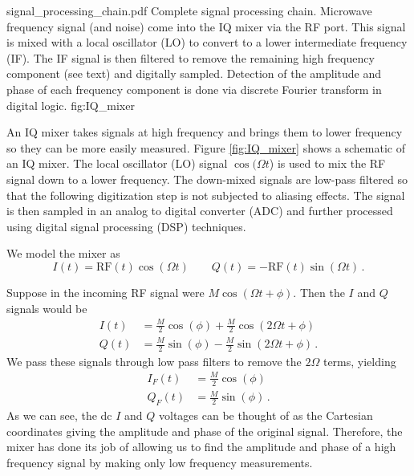 
{signal_processing_chain.pdf}
{Complete signal processing chain. Microwave frequency signal (and noise) come into the IQ mixer via the RF port. This signal is mixed with a local oscillator (LO) to convert to a lower intermediate frequency (IF). The IF signal is then filtered to remove the remaining high frequency component (see text) and digitally sampled. Detection of the amplitude and phase of each frequency component is done via discrete Fourier transform in digital logic.}
{fig:IQ_mixer}

An IQ mixer takes signals at high frequency and brings them to lower frequency so they can be more easily measured.
Figure \ref{fig:IQ_mixer} shows a schematic of an IQ mixer.
The local oscillator (LO) signal $\cos(\Omega t$) is used to mix the RF signal down to a lower frequency.
The down-mixed signals are low-pass filtered so that the following digitization step is not subjected to aliasing effects.
The signal is then sampled in an analog to digital converter (ADC) and further processed using digital signal processing (DSP) techniques.

We model the mixer as
\begin{equation}
I(t) = \text{RF}(t) \cos(\Omega t) \qquad Q(t) = - \text{RF}(t) \sin(\Omega t) \, .
\end{equation}


Suppose in the incoming RF signal were $M \cos(\Omega t + \phi)$.
Then the $I$ and $Q$ signals would be
\begin{align}
I(t) &= \frac{M}{2} \cos(\phi) + \frac{M}{2} \cos(2\Omega t + \phi) \\
Q(t) &= \frac{M}{2} \sin(\phi) - \frac{M}{2} \sin(2\Omega t + \phi) \, .
\end{align}
We pass these signals through low pass filters to remove the $2 \Omega$ terms, yielding
\begin{align}
I_F(t) &= \frac{M}{2} \cos(\phi) \\
Q_F(t) &= \frac{M}{2} \sin(\phi) \, .
\end{align}
As we can see, the dc $I$ and $Q$ voltages can be thought of as the Cartesian coordinates giving the amplitude and phase of the original signal.
Therefore, the mixer has done its job of allowing us to find the amplitude and phase of a high frequency signal by making only low frequency measurements.


